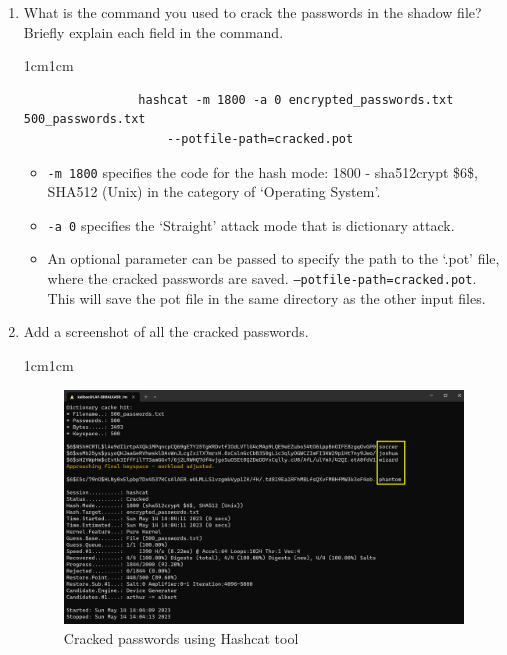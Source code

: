 \documentclass[11pt,letterpaper]{article}
\newenvironment{answer}{\em \color{blue} \begin{adjustwidth}{1cm}{1cm}}{\end{adjustwidth}}
\begin{document}
\begin{enumerate}
		\item What is the command you used to crack the passwords in the shadow file? Briefly explain each field in the command.
		
		\begin{answer}
			
			\begin{verbatim}
				hashcat -m 1800 -a 0 encrypted_passwords.txt 500_passwords.txt
				    --potfile-path=cracked.pot
			\end{verbatim}
			
			\begin{itemize}
				\item {\tt -m 1800} specifies the code for the hash mode: 1800 -  sha512crypt \$6\$, SHA512 (Unix) in the category of `Operating System'.
				
				\item {\tt -a 0} specifies the `Straight' attack mode that is dictionary attack.
				
				\item An optional parameter can be passed to specify the path to the `.pot' file, where the cracked passwords are saved. {\tt --potfile-path=cracked.pot}. This will save the pot file in the same directory as the other input files.
			\end{itemize}
			
			
		\end{answer}
		
		\item Add a screenshot of all the cracked passwords.
		
		\begin{answer}
			\begin{figure}[h]
				\centering
				\includegraphics[width=0.9\columnwidth]{images/cracked_shadow}
				\caption{Cracked passwords using Hashcat tool} \label{fig:cracked_shadow}
			\end{figure}
		\end{answer}
		

\end{enumerate}
\end{document}
